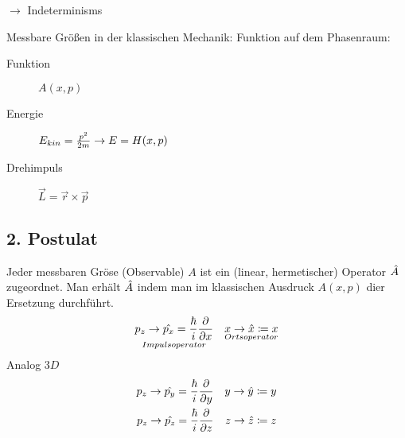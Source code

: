 \begin{bem}
    $\longrightarrow$ Indeterminisms
\end{bem}
    
Messbare Größen in der klassischen Mechanik: Funktion auf dem Phasenraum:
\begin{description}
    \item[Funktion] $A(x,p)$
    \item[Energie] $E_{kin} = \frac{p^2}{2m} \rightarrow E=H(x,p)$
    \item[Drehimpuls] $\vec{L} = \vec{r} \times \vec{p}$
\end{description}

\subsection{2. Postulat} %
\label{ssub:2._Postulat}
Jeder messbaren Gröse (Observable) $A$ ist ein (linear, hermetischer) Operator
$\hat{A}$ zugeordnet. Man erhält $\hat{A}$ indem man im klassischen Ausdruck
$A(x,p)$ dier Ersetzung durchführt.
\begin{align*}
    \underset{Impulsoperator}{p_z \rightarrow \hat{p_x} = \frac{\hbar}{i}\frac{\partial}{\partial
    x}} && \underset{Ortsoperator}{x \rightarrow \hat{x} \coloneqq x} \\
\end{align*}
Analog $3D$
\begin{align*}
    p_z \rightarrow \hat{p_y} = \frac{\hbar}{i}\frac{\partial}{\partial y} &&  y \rightarrow \hat{y} \coloneqq y \\
    p_z \rightarrow \hat{p_z} = \frac{\hbar}{i}\frac{\partial}{\partial z} &&  z \rightarrow \hat{z} \coloneqq z 
\end{align*}
